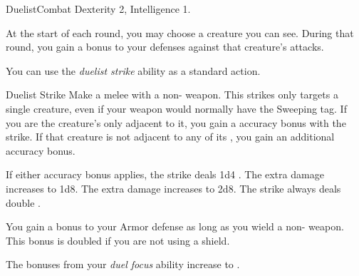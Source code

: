     \begin{feat}{Duelist}{Combat}
        \featpre Dexterity 2, Intelligence 1.

         At the start of each round, you may choose a creature you can see.
        During that round, you gain a  bonus to your defenses against that creature's attacks.

         You can use the \textit{duelist strike} ability as a standard action.
        \begin{activeability}{Duelist Strike}
            \rankline
            Make a melee  with a non- weapon.
            This strikes only targets a single creature, even if your weapon would normally have the Sweeping tag.
            If you are the creature's only  adjacent to it, you gain a  accuracy bonus with the strike.
            If that creature is not adjacent to any of its , you gain an additional  accuracy bonus.

            \rankline
             If either accuracy bonus applies, the strike deals 1d4 .
             The extra damage increases to 1d8.
             The extra damage increases to 2d8.
             The strike always deals double .
        \end{activeability}

         You gain a  bonus to your Armor defense as long as you wield a non- weapon.
        This bonus is doubled if you are not using a shield.

         The bonuses from your \textit{duel focus} ability increase to .
    \end{feat}

